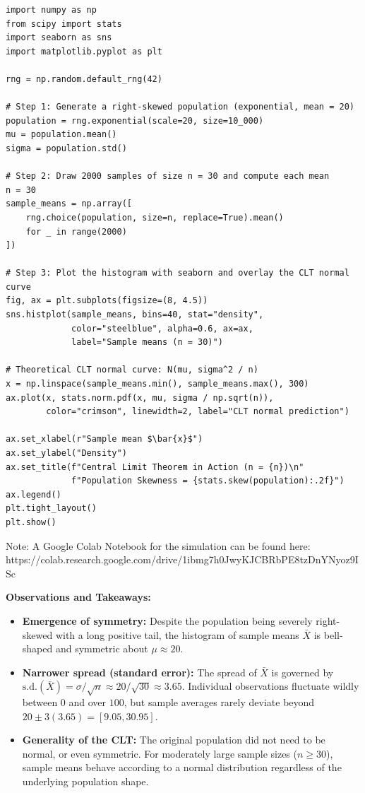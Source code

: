 \begin{lstlisting}[style=pythonstyle]
import numpy as np
from scipy import stats
import seaborn as sns
import matplotlib.pyplot as plt

rng = np.random.default_rng(42)

# Step 1: Generate a right-skewed population (exponential, mean = 20)
population = rng.exponential(scale=20, size=10_000)
mu = population.mean()
sigma = population.std()

# Step 2: Draw 2000 samples of size n = 30 and compute each mean
n = 30
sample_means = np.array([
    rng.choice(population, size=n, replace=True).mean()
    for _ in range(2000)
])

# Step 3: Plot the histogram with seaborn and overlay the CLT normal curve
fig, ax = plt.subplots(figsize=(8, 4.5))
sns.histplot(sample_means, bins=40, stat="density",
             color="steelblue", alpha=0.6, ax=ax,
             label="Sample means (n = 30)")

# Theoretical CLT normal curve: N(mu, sigma^2 / n)
x = np.linspace(sample_means.min(), sample_means.max(), 300)
ax.plot(x, stats.norm.pdf(x, mu, sigma / np.sqrt(n)),
        color="crimson", linewidth=2, label="CLT normal prediction")

ax.set_xlabel(r"Sample mean $\bar{x}$")
ax.set_ylabel("Density")
ax.set_title(f"Central Limit Theorem in Action (n = {n})\n"
             f"Population Skewness = {stats.skew(population):.2f}")
ax.legend()
plt.tight_layout()
plt.show()
\end{lstlisting}

Note: A Google Colab Notebook for the simulation can be found here: https://colab.research.google.com/drive/1ibmg7h0JwyKJCBRbPE8tzDnYNyoz9ISc

\textbf{Observations and Takeaways:}
\begin{itemize}[leftmargin=*]
  \item \textbf{Emergence of symmetry:} Despite the population being severely right-skewed with a long positive tail, the histogram of sample means $\bar{X}$ is bell-shaped and symmetric about $\mu \approx 20$.
  \item \textbf{Narrower spread (standard error):} The spread of $\bar{X}$ is governed by $\mathrm{s.d.}(\bar{X}) = \sigma / \sqrt{n} \approx 20 / \sqrt{30} \approx 3.65$. Individual observations fluctuate wildly between $0$ and over $100$, but sample averages rarely deviate beyond $20 \pm 3(3.65) = [9.05, 30.95]$.
  \item \textbf{Generality of the CLT:} The original population did not need to be normal, or even symmetric. For moderately large sample sizes ($n \geq 30$), sample means behave according to a normal distribution regardless of the underlying population shape.
\end{itemize}
